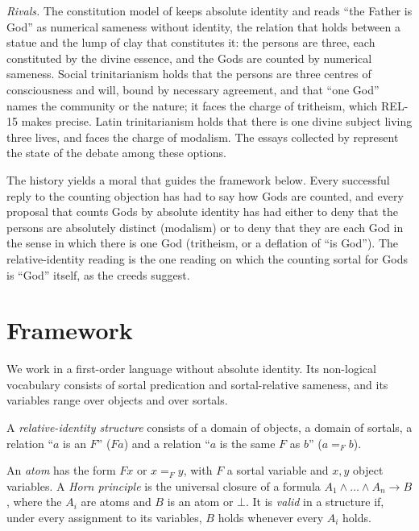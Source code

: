\documentclass{situationist-preprint}
\begin{document}
\emph{Rivals.} The constitution model of \citet{BrowerRea2005} keeps absolute identity and reads \enquote{the Father is God} as numerical sameness without identity, the relation that holds between a statue and the lump of clay that constitutes it: the persons are three, each constituted by the divine essence, and the Gods are counted by numerical sameness. Social trinitarianism \citep{Swinburne1994,Hasker2013} holds that the persons are three centres of consciousness and will, bound by necessary agreement, and that \enquote{one God} names the community or the nature; it faces the charge of tritheism, which REL-15 makes precise. Latin trinitarianism \citep{Leftow2004} holds that there is one divine subject living three lives, and faces the charge of modalism. The essays collected by \citet{McCallRea2009} represent the state of the debate among these options.

The history yields a moral that guides the framework below. Every successful reply to the counting objection has had to say how Gods are counted, and every proposal that counts Gods by absolute identity has had either to deny that the persons are absolutely distinct (modalism) or to deny that they are each God in the sense in which there is one God (tritheism, or a deflation of \enquote{is God}). The relative-identity reading is the one reading on which the counting sortal for Gods is \enquote{God} itself, as the creeds suggest.

\section{Framework}

We work in a first-order language without absolute identity. Its non-logical vocabulary consists of sortal predication and sortal-relative sameness, and its variables range over objects and over sortals.

\begin{definition}\label{d:struct}
A \emph{relative-identity structure} consists of a domain of objects, a domain of sortals, a relation \enquote{$a$ is an $F$} ($F a$) and a relation \enquote{$a$ is the same $F$ as $b$} ($a =_F b$).
\end{definition}

\begin{definition}\label{d:horn}
An \emph{atom} has the form $F x$ or $x =_F y$, with $F$ a sortal variable and $x, y$ object variables. A \emph{Horn principle} is the universal closure of a formula $A_1 \wedge \dots \wedge A_n \to B$, where the $A_i$ are atoms and $B$ is an atom or $\bot$. It is \emph{valid} in a structure if, under every assignment to its variables, $B$ holds whenever every $A_i$ holds.
\end{definition}
\end{document}
